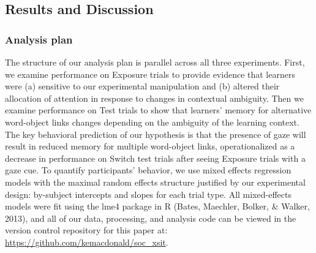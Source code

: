 \documentclass[authoryear, review]{elsarticle}
\begin{document}
\subsection{Results and Discussion}\label{results-and-discussion}

\subsubsection{Analysis plan}\label{analysis-plan}

The structure of our analysis plan is parallel across all three
experiments. First, we examine performance on Exposure trials to provide
evidence that learners were (a) sensitive to our experimental
manipulation and (b) altered their allocation of attention in response
to changes in contextual ambiguity. Then we examine performance on Test
trials to show that learners' memory for alternative word-object links
changes depending on the ambiguity of the learning context. The key
behavioral prediction of our hypothesis is that the presence of gaze
will result in reduced memory for multiple word-object links,
operationalized as a decrease in performance on Switch test trials after
seeing Exposure trials with a gaze cue. To quantify participants'
behavior, we use mixed effects regression models with the maximal random
effects structure justified by our experimental design: by-subject
intercepts and slopes for each trial type. All mixed-effects models were
fit using the lme4 package in R (Bates, Maechler, Bolker, \& Walker,
2013), and all of our data, processing, and analysis code can be viewed
in the version control repository for this paper at:
\url{https://github.com/kemacdonald/soc_xsit}.
\end{document}
